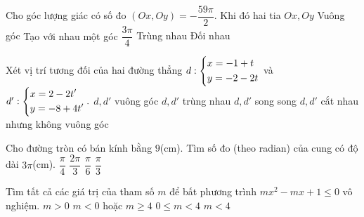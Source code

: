 \begin{ex}%
	Cho góc lượng giác có số đo $(Ox,Oy)=-\dfrac{59\pi}{2}$. Khi đó hai tia $Ox,Oy$ 
	\choice
	{\True Vuông góc}
	{Tạo với nhau một góc $\dfrac{3\pi}{4}$}
	{Trùng nhau}
	{Đối nhau}
\end{ex}
\begin{ex}%
	Xét vị trí tương đối của hai đường thẳng $d:\left\{\begin{aligned}&x=-1+t\\&y=-2-2t\end{aligned}\right.$ và $d':\left\{\begin{aligned}&x=2-2t'\\&y=-8+4t'\end{aligned}\right..$
	\choice
	{$d,d'$ vuông góc}
	{\True $d,d'$ trùng nhau}
	{$d,d'$ song song}
	{$d,d'$ cắt nhau nhưng không vuông góc}
\end{ex}
\begin{ex}%
	Cho đường tròn có bán kính bằng $9$(cm). Tìm số đo (theo radian) của cung có độ dài $3\pi$(cm). 
	\choice
	{$\dfrac{\pi}{4}$}
	{$\dfrac{2\pi}{3}$}
	{$\dfrac{\pi}{6}$}
	{\True $\dfrac{\pi}{3}$}
\end{ex}
\begin{ex}%
	Tìm tất cả các giá trị của tham số $m$ để bất phương trình $mx^2-mx+1\le 0$ vô nghiệm.
	\choice
	{$m>0$}
	{$m<0$ hoặc $m\ge 4$}
	{\True $0\le m<4$}
	{$m<4$}
\end{ex}

